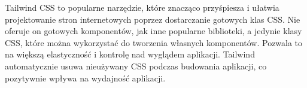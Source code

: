 Tailwind CSS to popularne narzędzie, które znacząco przyśpiesza i ułatwia projektowanie stron internetowych poprzez dostarczanie gotowych klas CSS. Nie oferuje on gotowych komponentów, jak inne popularne biblioteki, a jedynie klasy CSS, które można wykorzystać do tworzenia własnych komponentów. Pozwala to na większą elastyczność i kontrolę nad wyglądem aplikacji. Tailwind automatycznie usuwa nieużywany CSS podczas budowania aplikacji, co pozytywnie wpływa na wydajność aplikacji. \autocite{tailwind}